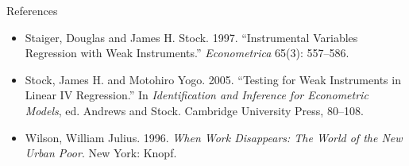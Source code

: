 \documentclass[aspectratio=169,11pt,xcolor=dvipsnames]{beamer}
\begin{document}
\begin{frame}[allowframebreaks,t]{References}
\begin{itemize}
{Political Science} 55(1): 188--200.
\item Staiger, Douglas and James H. Stock. 1997. ``Instrumental Variables
Regression with Weak Instruments.'' \textit{Econometrica} 65(3): 557--586.
\item Stock, James H. and Motohiro Yogo. 2005. ``Testing for Weak Instruments in
Linear IV Regression.'' In \textit{Identification and Inference for Econometric
Models}, ed. Andrews and Stock. Cambridge University Press, 80--108.
\item Wilson, William Julius. 1996. \textit{When Work Disappears: The World of the New Urban Poor}. New York: Knopf.
\end{itemize}
\end{frame}
\end{document}
